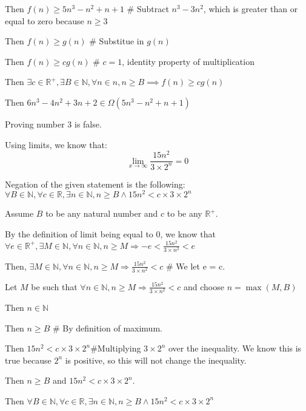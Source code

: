\documentclass{article}
\begin{document}
\begin{enumerate}
\begin{description}
\begin{description}
		\item Then $f(n) \geq 5n^3 - n^2 + n + 1$ \# Subtract $n^3 - 3n^2$, which is greater than or equal to zero because $n \geq 3$
		\item Then $f(n) \geq g(n)$ \# Substitue in $g(n)$
		\item Then $f(n) \geq cg(n)$ \# $c = 1$, identity property of multiplication
		\end{description}
	\item Then $\exists c \in \mathbb{R}^+, \exists B \in \mathbb{N}, \forall n \in n, n \geq B \implies f(n) \geq cg(n)$
	\item Then $6n^3 - 4n^2 + 3n + 2 \in \Omega(5n^3 - n^2 + n + 1)$
	\end{description}
	
\item Proving number 3 is false.
	\begin{description}
		\item Using limits, we know that:	
		\begin{equation*}
		\lim_{x\to\infty}\frac{15n^2}{3 \times 2^n}=0
		\end{equation*}
		\item Negation of the given statement is the following: $\forall B \in \mathbb{N}, \forall c \in \mathbb{R}, \exists n \in \mathbb{N}, n\geq B \wedge 15n^2 < c\times 3 \times 2^n$
		\item Assume $B$ to be any natural number and $c$ to be any $\mathbb{R}^+$.
		\begin{description}
			\item By the definition of limit being equal to 0, we know that $\forall e \in \mathbb{R}^+, \exists M \in \mathbb{N}, \forall n \in \mathbb{N}, n \geq M \Rightarrow -e < \frac{15n^2}{3\times n^2}< e$
			\item Then, $\exists M \in \mathbb{N}, \forall n \in \mathbb{N}, n \geq M \Rightarrow \frac{15n^2}{3\times n^2} < c$ \# We let e = c.
			\item Let $M$ be such that $\forall n \in \mathbb{N}, n \geq M \Rightarrow \frac{15n^2}{3\times n^2} < c$ and choose $n = \max(M,B)$
			\item Then $n \in \mathbb{N}$
			\item Then $n \geq B$ \# By definition of maximum.
			\item Then $15n^2 < c \times 3 \times 2^n$\#Multiplying $3\times 2^n$ over the inequality. We know this is true because $2^n$ is positive, so this will not change the inequality.
			\item Then $n \geq B$ and $15n^2 < c\times 3\times 2^n$.
		\end{description}
		\item Then $\forall B \in \mathbb{N}, \forall c \in \mathbb{R}, \exists n \in \mathbb{N}, n\geq B \wedge 15n^2 < c\times 3 \times 2^n$
	\end{description}
	

\end{enumerate}
\end{document}
